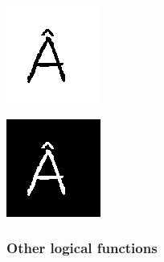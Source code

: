\begin{minipage}{0.5\linewidth}
	\centering
	\includegraphics[width=0.9\linewidth]{./Experiments/LOGNOT/fig/Input.png} 
\end{minipage}
\begin{minipage}{0.5\linewidth}
	\centering
	\includegraphics[width=0.9\linewidth]{./Experiments/LOGNOT/fig/Output.png}
\end{minipage}

\subsubsection{Other logical functions}